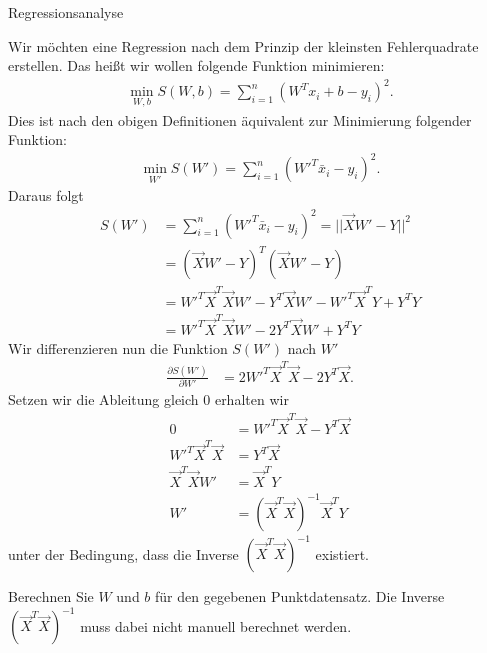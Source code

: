 \begin{task}[credit=7]{Regressionsanalyse}
\begin{subtask}[title=Herleitung,points=5]
\begin{solution}
Wir möchten eine Regression nach dem Prinzip der kleinsten Fehlerquadrate erstellen. Das heißt wir wollen folgende Funktion minimieren:
\begin{align*}
\min_{W,b} S(W,b) = \sum_{i=1}^n (W^T x_i + b - y_i)^2.
\end{align*}
Dies ist nach den obigen Definitionen äquivalent zur Minimierung folgender Funktion:
\begin{align*}
\min_{W'} S(W') = \sum_{i=1}^n (W'^T \bar{x}_i - y_i)^2.
\end{align*}
Daraus folgt
\begin{align*}
S(W') &= \sum_{i=1}^n (W'^T \bar{x}_i - y_i)^2 = ||  \vec{X} W' - Y ||^2\\
&= (\vec{X}W' - Y)^T(\vec{X}W' - Y) \\
&= W'^T \vec{X}^T \vec{X}W' - Y^T \vec{X} W' - W'^T \vec{X}^T Y + Y^T Y \\
&= W'^T \vec{X}^T \vec{X} W' - 2 Y^T \vec{X} W' + Y^T Y
\end{align*}
Wir differenzieren nun die Funktion $S(W')$ nach $W'$
\begin{align*}
\frac{\partial S(W')}{\partial W'} &= 2 W'^T \vec{X}^T \vec{X} - 2 Y^T \vec{X}.
\end{align*}
Setzen wir die Ableitung gleich 0 erhalten wir
\begin{align*}
0 &= W'^T \vec{X}^T \vec{X} - Y^T \vec{X} \\
W'^T \vec{X}^T \vec{X} &= Y^T \vec{X} \\
\vec{X}^T \vec{X} W' &= \vec{X}^T Y \\
W' &= (\vec{X}^T \vec{X})^{-1} \vec{X}^T Y
\end{align*}
unter der Bedingung, dass die Inverse $(\vec{X}^T \vec{X})^{-1}$ existiert.
\end{solution}
\end{subtask}


\begin{subtask}[title=Parameterbestimmung,points=2]
Berechnen Sie $W$ und $b$ für den gegebenen Punktdatensatz. Die Inverse $(\vec{X}^{T}\vec{X})^{-1}$ muss dabei nicht manuell berechnet werden.


\end{subtask}
\end{task}
